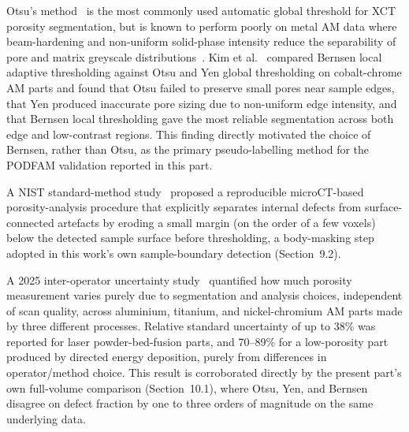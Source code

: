 
Otsu's method~\citep{Otsu1979} is the most commonly used automatic global threshold for XCT porosity
segmentation, but is known to perform poorly on metal AM data where beam-hardening and non-uniform
solid-phase intensity reduce the separability of pore and matrix greyscale
distributions~\citep{Kim2017}. Kim et al.~\citep{Kim2017} compared Bernsen local adaptive
thresholding against Otsu and Yen global thresholding on cobalt-chrome AM parts and found that Otsu
failed to preserve small pores near sample edges, that Yen produced inaccurate pore sizing due to
non-uniform edge intensity, and that Bernsen local thresholding gave the most reliable segmentation
across both edge and low-contrast regions. This finding directly motivated the choice of Bernsen,
rather than Otsu, as the primary pseudo-labelling method for the PODFAM validation reported in this
part.

A NIST standard-method study~\citep{NIST_Standard} proposed a reproducible microCT-based
porosity-analysis procedure that explicitly separates internal defects from surface-connected
artefacts by eroding a small margin (on the order of a few voxels) below the detected sample surface
before thresholding, a body-masking step adopted in this work's own sample-boundary detection
(Section~9.2).

A 2025 inter-operator uncertainty study~\citep{AppliedSciences2025} quantified how much porosity
measurement varies purely due to segmentation and analysis choices, independent of scan quality,
across aluminium, titanium, and nickel-chromium AM parts made by three different processes. Relative
standard uncertainty of up to 38\% was reported for laser powder-bed-fusion parts, and 70--89\% for a
low-porosity part produced by directed energy deposition, purely from differences in operator/method
choice. This result is corroborated directly by the present part's own full-volume comparison
(Section~10.1), where Otsu, Yen, and Bernsen disagree on defect fraction by one to three orders of
magnitude on the same underlying data.

